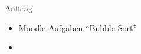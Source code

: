 \begin{frame}[fragile]{Auftrag}
	\begin{itemize}
		\item Moodle-Aufgaben \enquote{Bubble Sort}
		\item {}
	\end{itemize}
\end{frame}

